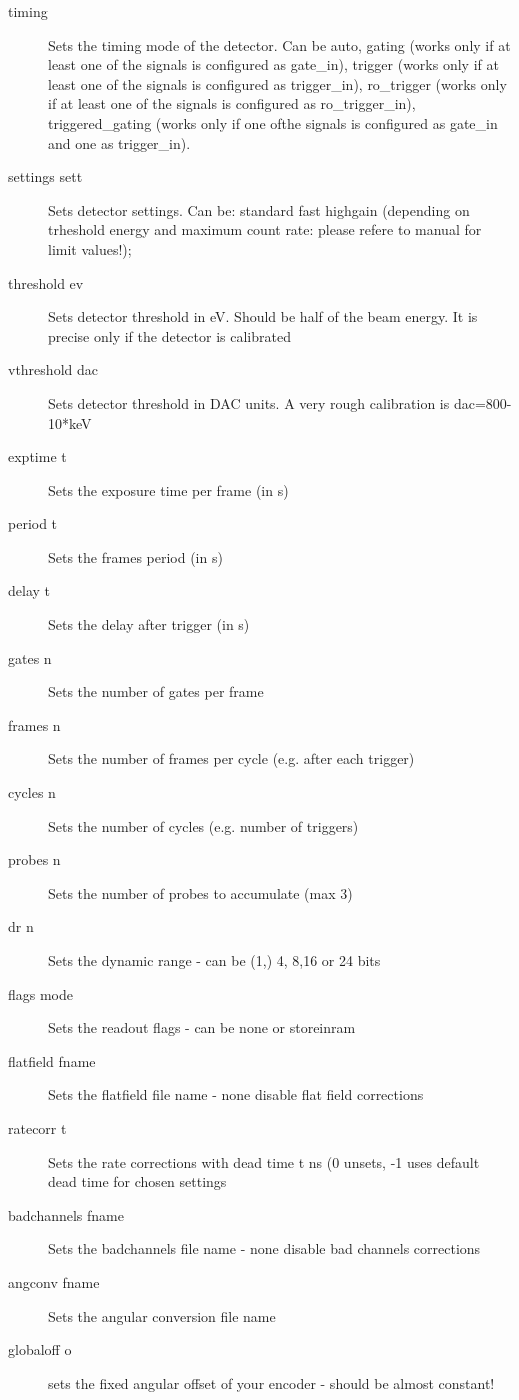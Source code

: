 \documentclass{report}
\begin{document}
\begin{description}
\item[timing]           Sets the timing mode of the detector. Can be auto, gating  (works only if at least one of the signals is configured as gate\_in), trigger (works only if at least one of the signals is configured as trigger\_in), ro\_trigger (works only if at least one of the signals is configured as ro\_trigger\_in), triggered\_gating (works only if one ofthe signals is configured as gate\_in and one as trigger\_in).
\item[settings sett]  	Sets detector settings. Can be:  standard fast  highgain (depending on trheshold energy and maximum count rate: please refere to manual for limit values!);
\item[threshold ev]  	Sets detector threshold in eV. Should be half of the beam energy. It is precise only if the detector is calibrated
\item[vthreshold dac]  	Sets detector threshold in DAC units. A very rough calibration is dac=800-10*keV
\item[exptime t]  	Sets the exposure time per frame (in s)
\item[period t] 	Sets the frames period (in s)
\item[delay t] 	Sets the delay after trigger (in s)
\item[gates n]  	Sets the number of gates per frame
\item[frames n]  	Sets the number of frames per cycle (e.g. after each trigger)
\item[cycles n]  	Sets the number of cycles (e.g. number of triggers)
\item[probes n]  	Sets the number of probes to accumulate (max 3)
\item[dr n]  		Sets the dynamic range - can be (1,) 4, 8,16 or 24 bits
\item[flags mode]  	Sets the readout flags - can be none or storeinram
\item[flatfield fname] Sets the flatfield file name - none disable flat field corrections
\item[ratecorr t]  	Sets the rate corrections with dead time t ns (0 unsets, -1 uses default dead time for chosen settings
\item[badchannels fname]  Sets the badchannels file name - none disable bad channels corrections
\item[angconv fname]  	Sets the angular conversion file name
\item[globaloff o]  	sets the fixed angular offset of your encoder - should be almost constant!

\end{description}
\end{document}
